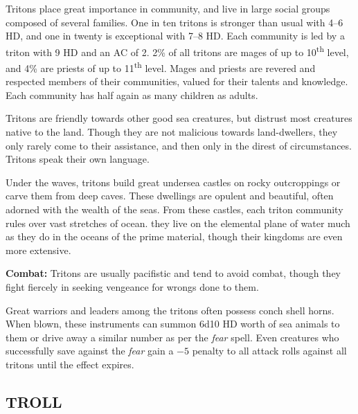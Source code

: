 \begin{multicols}{2}
Tritons place great importance in community, and live in large social groups composed of several families. One in ten tritons is stronger than usual with 4--6 HD, and one in twenty is exceptional with 7--8 HD. Each community is led by a triton with 9 HD and an AC of 2. 2\% of all tritons are mages of up to 10\textsuperscript{th} level, and 4\% are priests of up to 11\textsuperscript{th} level. Mages and priests are revered and respected members of their communities, valued for their talents and knowledge. Each community has half again as many children as adults.

Tritons are friendly towards other good sea creatures, but distrust most creatures native to the land. Though they are not malicious towards land-dwellers, they only rarely come to their assistance, and then only in the direst of circumstances. Tritons speak their own language.

Under the waves, tritons build great undersea castles on rocky outcroppings or carve them from deep caves. These dwellings are opulent and beautiful, often adorned with the wealth of the seas. From these castles, each triton community rules over vast stretches of ocean. they live on the elemental plane of water much as they do in the oceans of the prime material, though their kingdoms are even more extensive.

\textbf{Combat:} Tritons are usually pacifistic and tend to avoid combat, though they fight fiercely in seeking vengeance for wrongs done to them.

Great warriors and leaders among the tritons often possess conch shell horns. When blown, these instruments can summon 6d10 HD worth of sea animals to them or drive away a similar number as per the \textit{fear} spell. Even creatures who successfully save against the \textit{fear} gain a $-5$ penalty to all attack rolls against all tritons until the effect expires.

\noindent
\begin{minipage}{\columnwidth}

\vspace{1em}

\subsection{TROLL}


\end{minipage}
\end{multicols}
